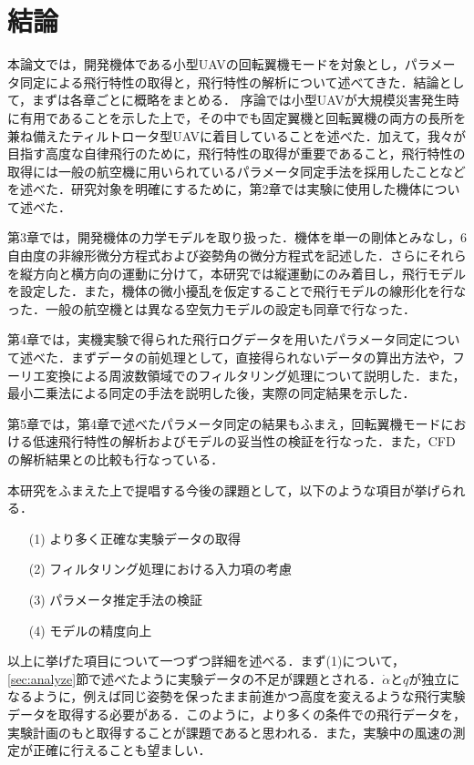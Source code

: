 
\chapter{結論}
\label{conclusion}

本論文では，開発機体である小型UAVの回転翼機モードを対象とし，パラメータ同定による飛行特性の取得と，飛行特性の解析について述べてきた．結論として，まずは各章ごとに概略をまとめる．
序論では小型UAVが大規模災害発生時に有用であることを示した上で，その中でも固定翼機と回転翼機の両方の長所を兼ね備えたティルトロータ型UAVに着目していることを述べた．加えて，我々が目指す高度な自律飛行のために，飛行特性の取得が重要であること，飛行特性の取得には一般の航空機に用いられているパラメータ同定手法を採用したことなどを述べた．研究対象を明確にするために，第2章では実験に使用した機体について述べた．

第3章では，開発機体の力学モデルを取り扱った．機体を単一の剛体とみなし，6自由度の非線形微分方程式および姿勢角の微分方程式を記述した．さらにそれらを縦方向と横方向の運動に分けて，本研究では縦運動にのみ着目し，飛行モデルを設定した．また，機体の微小擾乱を仮定することで飛行モデルの線形化を行なった．一般の航空機とは異なる空気力モデルの設定も同章で行なった．

第4章では，実機実験で得られた飛行ログデータを用いたパラメータ同定について述べた．まずデータの前処理として，直接得られないデータの算出方法や，フーリエ変換による周波数領域でのフィルタリング処理について説明した．また，最小二乗法による同定の手法を説明した後，実際の同定結果を示した．

第5章では，第4章で述べたパラメータ同定の結果もふまえ，回転翼機モードにおける低速飛行特性の解析およびモデルの妥当性の検証を行なった．また，CFDの解析結果との比較も行なっている．

\vspace{5pt}

本研究をふまえた上で提唱する今後の課題として，以下のような項目が挙げられる．
\begin{itemize}
  \item[(1)] より多く正確な実験データの取得
  \item[(2)] フィルタリング処理における入力項の考慮
  \item[(3)] パラメータ推定手法の検証
  \item[(4)] モデルの精度向上
\end{itemize}

以上に挙げた項目について一つずつ詳細を述べる．まず(1)について，\ref{sec:analyze}節で述べたように実験データの不足が課題とされる．$\dot{\alpha}$と$q$が独立になるように，例えば同じ姿勢を保ったまま前進かつ高度を変えるような飛行実験データを取得する必要がある．このように，より多くの条件での飛行データを，実験計画のもと取得することが課題であると思われる．また，実験中の風速の測定が正確に行えることも望ましい．


